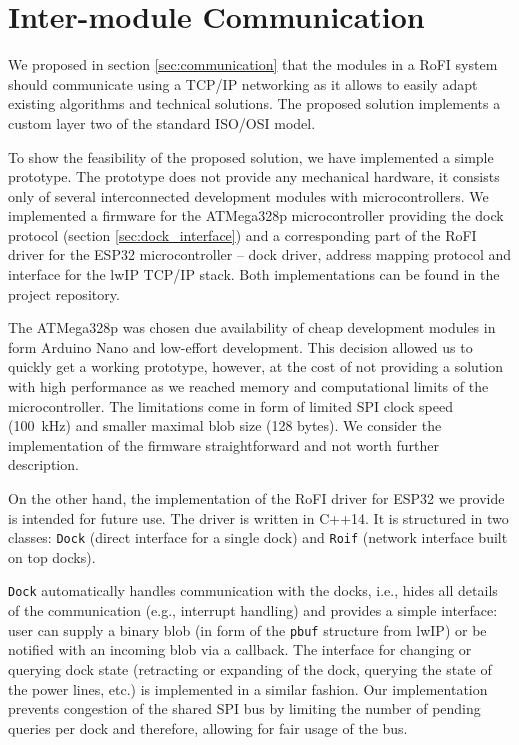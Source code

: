 \section{Inter-module Communication}

We proposed in section \ref{sec:communication} that the modules in a RoFI system
should communicate using a TCP/IP networking as it allows to easily adapt
existing algorithms and technical solutions. The proposed solution implements a
custom layer two of the standard ISO/OSI model.

To show the feasibility of the proposed solution, we have implemented a simple
prototype. The prototype does not provide any mechanical hardware, it consists
only of several interconnected development modules with microcontrollers. We
implemented a firmware for the ATMega328p microcontroller providing the dock
protocol (section \ref{sec:dock_interface}) and a corresponding part of the RoFI
driver for the ESP32 microcontroller -- dock driver, address mapping protocol
and interface for the lwIP TCP/IP stack. Both implementations can be found in the
project repository.

The ATMega328p was chosen due availability of cheap development modules in form
Arduino Nano and low-effort development. This decision allowed us to quickly get
a working prototype, however, at the cost of not providing a solution with high
performance as we reached memory and computational limits of the
microcontroller. The limitations come in form of limited SPI clock speed
(100~kHz) and smaller maximal blob size (128 bytes). We consider the
implementation of the firmware straightforward and not worth further
description.

On the other hand, the implementation of the RoFI driver for ESP32 we provide is
intended for future use. The driver is written in C++14. It is structured in two
classes: \texttt{Dock} (direct interface for a single dock) and \texttt{Roif}
(network interface built on top docks).

\texttt{Dock} automatically handles communication with the docks, i.e., hides
all details of the communication (e.g., interrupt handling) and provides a
simple interface: user can supply a binary blob (in form of the \texttt{pbuf}
structure from lwIP) or be notified with an incoming blob via a callback. The
interface for changing or querying dock state (retracting or expanding of the
dock, querying the state of the power lines, etc.) is implemented in a similar
fashion. Our implementation prevents congestion of the shared SPI bus by
limiting the number of pending queries per dock and therefore, allowing for fair
usage of the bus.

